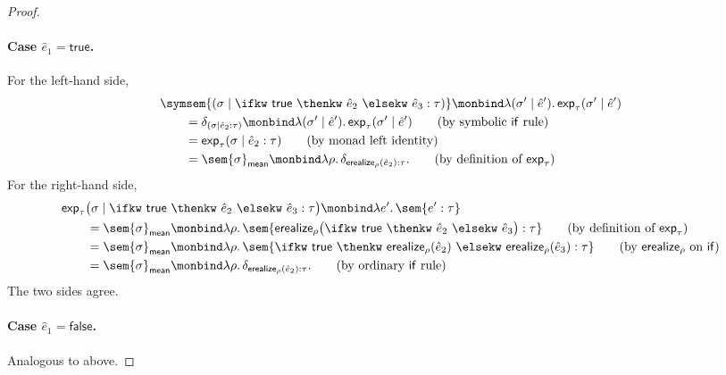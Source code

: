 \begin{proof}
  \paragraph{Case $\hat e_1 = \mathsf{true}$.}
  For the left-hand side,
  \begin{align}
    &\symsem{
      (\sigma \mid
      \ifkw\ \mathsf{true}\ \thenkw\ \hat e_2\
      \elsekw\ \hat e_3 : \tau)
    }
    \monbind
    \lambda(\sigma' \mid \hat e').\,
    \mathsf{exp}_\tau(\sigma' \mid \hat e')
    \notag \\
    &\qquad=
    \delta_{(\sigma \mid \hat e_2 : \tau)}
    \monbind
    \lambda(\sigma' \mid \hat e').\,
    \mathsf{exp}_\tau(\sigma' \mid \hat e')
    \tag{\text{by symbolic $\mathsf{if}$ rule}} \\
    &\qquad=
    \mathsf{exp}_\tau(\sigma \mid \hat e_2 : \tau)
    \tag{\text{by monad left identity}} \\
    &\qquad=
    \sem{\sigma}_{\mathsf{mean}}
    \monbind
    \lambda\rho.\,
    \delta_{\mathsf{erealize}_\rho(\hat e_2) : \tau}.
    \tag{\text{by definition of $\mathsf{exp}_\tau$}}
  \end{align}
  For the right-hand side,
  \begin{align}
    &\mathsf{exp}_\tau
    \bigl(
      \sigma
      \mid
      \ifkw\ \mathsf{true}\ \thenkw\ \hat e_2\
      \elsekw\ \hat e_3 : \tau
    \bigr)
    \monbind
    \lambda e'.\,\sem{e' : \tau}
    \notag \\
    &\qquad=
    \sem{\sigma}_{\mathsf{mean}}
    \monbind
    \lambda\rho.\,
    \sem{
      \mathsf{erealize}_\rho
      \bigl(
        \ifkw\ \mathsf{true}\ \thenkw\ \hat e_2\
        \elsekw\ \hat e_3
      \bigr)
      : \tau
    }
    \tag{\text{by definition of $\mathsf{exp}_\tau$}} \\
    &\qquad=
    \sem{\sigma}_{\mathsf{mean}}
    \monbind
    \lambda\rho.\,
    \sem{
      \ifkw\ \mathsf{true}\
      \thenkw\ \mathsf{erealize}_\rho(\hat e_2)\
      \elsekw\ \mathsf{erealize}_\rho(\hat e_3)
      : \tau
    }
    \tag{\text{by $\mathsf{erealize}_\rho$ on $\mathsf{if}$}} \\
    &\qquad=
    \sem{\sigma}_{\mathsf{mean}}
    \monbind
    \lambda\rho.\,
    \delta_{\mathsf{erealize}_\rho(\hat e_2) : \tau}.
    \tag{\text{by ordinary $\mathsf{if}$ rule}}
  \end{align}
  The two sides agree.

  \paragraph{Case $\hat e_1 = \mathsf{false}$.} Analogous to above.


\end{proof}
